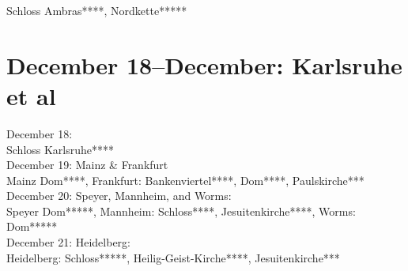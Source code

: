 Schloss Ambras****, Nordkette*****

\section{December 18--December: Karlsruhe et al}

December 18:\\
Schloss Karlsruhe****\\

December 19: Mainz \& Frankfurt\\
Mainz Dom****, Frankfurt: Bankenviertel****, Dom****, Paulskirche***\\

December 20: Speyer, Mannheim, and Worms:\\
Speyer Dom*****, Mannheim: Schloss****, Jesuitenkirche****, Worms: Dom*****\\

December 21: Heidelberg:\\
Heidelberg: Schloss*****, Heilig-Geist-Kirche****, Jesuitenkirche***